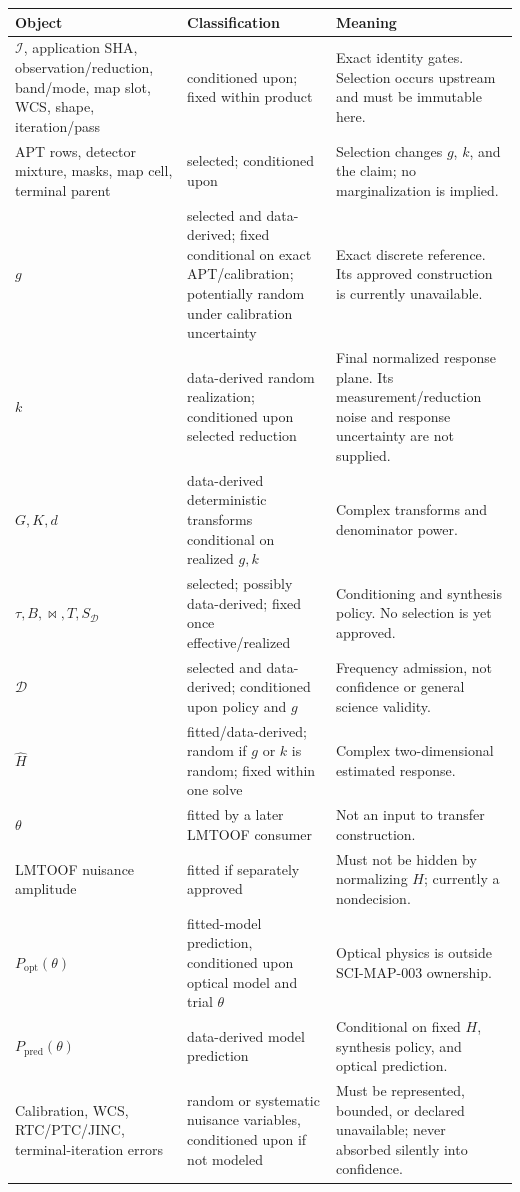 \documentclass[11pt]{article}
\begin{document}
\begin{longtable}{@{}L{0.18\textwidth}L{0.22\textwidth}L{0.51\textwidth}@{}}
\toprule
Object & Classification & Meaning \\
\midrule
\endhead
$\mathcal I$, application SHA, observation/reduction, band/mode, map slot,
WCS, shape, iteration/pass & conditioned upon; fixed within product & Exact
identity gates.  Selection occurs upstream and must be immutable here. \\
APT rows, detector mixture, masks, map cell, terminal parent & selected;
conditioned upon & Selection changes $g$, $k$, and the claim; no marginalization
is implied. \\
$g$ & selected and data-derived; fixed conditional on exact APT/calibration;
potentially random under calibration uncertainty & Exact discrete reference.
Its approved construction is currently unavailable. \\
$k$ & data-derived random realization; conditioned upon selected reduction &
Final normalized response plane.  Its measurement/reduction noise and response
uncertainty are not supplied. \\
$G,K,d$ & data-derived deterministic transforms conditional on realized
$g,k$ & Complex transforms and denominator power. \\
$\tau,B,\bowtie,T,S_{\mathcal D}$ & selected; possibly data-derived; fixed once
effective/realized & Conditioning and synthesis policy.  No selection is yet
approved. \\
$\mathcal D$ & selected and data-derived; conditioned upon policy and $g$ &
Frequency admission, not confidence or general science validity. \\
$\widehat H$ & fitted/data-derived; random if $g$ or $k$ is random; fixed within
one solve & Complex two-dimensional estimated response. \\
$\theta$ & fitted by a later LMTOOF consumer & Not an input to transfer
construction. \\
LMTOOF nuisance amplitude & fitted if separately approved & Must not be hidden
by normalizing $H$; currently a nondecision. \\
$P_{\mathrm{opt}}(\theta)$ & fitted-model prediction, conditioned upon optical
model and trial $\theta$ & Optical physics is outside SCI-MAP-003 ownership. \\
$P_{\mathrm{pred}}(\theta)$ & data-derived model prediction & Conditional on
fixed $H$, synthesis policy, and optical prediction. \\
Calibration, WCS, RTC/PTC/JINC, terminal-iteration errors & random or systematic
nuisance variables, conditioned upon if not modeled & Must be represented,
bounded, or declared unavailable; never absorbed silently into confidence. \\
\bottomrule
\end{longtable}
\end{document}
